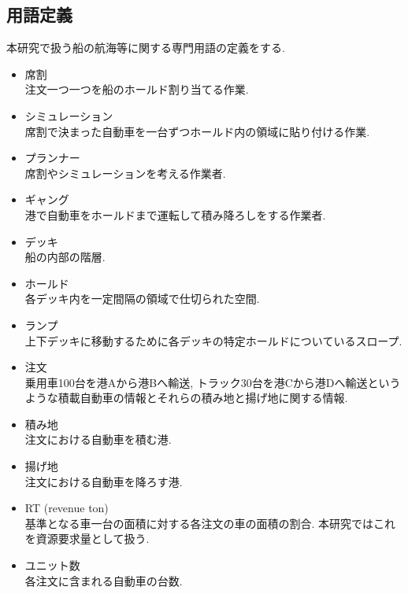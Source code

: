 \documentclass[a4j,11pt,twocolumn]{jsarticle}
\begin{document}
\subsection{用語定義}
本研究で扱う船の航海等に関する専門用語の定義をする.

\begin{itemize}

\item 席割 \\
注文一つ一つを船のホールド割り当てる作業.

\item シミュレーション \\
席割で決まった自動車を一台ずつホールド内の領域に貼り付ける作業.

\item  プランナー \\
席割やシミュレーションを考える作業者.

\item  ギャング\\
港で自動車をホールドまで運転して積み降ろしをする作業者.

\item デッキ \\
船の内部の階層.

\item ホールド \\
各デッキ内を一定間隔の領域で仕切られた空間.

\item ランプ \\
上下デッキに移動するために各デッキの特定ホールドについているスロープ.

\item 注文 \\
乗用車100台を港Aから港Bへ輸送, トラック30台を港Cから港Dへ輸送というような積載自動車の情報とそれらの積み地と揚げ地に関する情報.

\item 積み地 \\
注文における自動車を積む港.

\item 揚げ地 \\
注文における自動車を降ろす港.

\item  RT (revenue ton) \\
基準となる車一台の面積に対する各注文の車の面積の割合. 本研究ではこれを資源要求量として扱う\cite{stowage}.

\item ユニット数 \\
各注文に含まれる自動車の台数.

\end{itemize}
\end{document}

